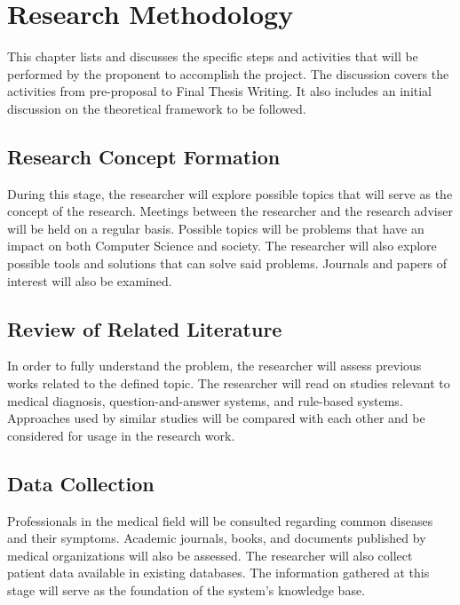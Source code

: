 %
%
%                 

\chapter{Research Methodology}
This chapter lists and discusses the specific steps and activities that will be performed by the proponent to accomplish the project. 
The discussion covers the activities from pre-proposal to Final Thesis Writing.  It also includes an initial discussion on the theoretical
framework to be followed.

\section{Research Concept Formation}
During this stage, the researcher will explore possible topics that will serve as the concept of the research. 
Meetings between the researcher and the research adviser will be held on a regular basis. 
Possible topics will be problems that have an impact on both Computer Science and society.
The researcher will also explore possible tools and solutions that can solve said problems.
Journals and papers of interest will also be examined.

\section{Review of Related Literature}
In order to fully understand the problem, the researcher will assess previous works related to the defined topic.
The researcher will read on studies relevant to medical diagnosis, question-and-answer systems, and rule-based systems.
Approaches used by similar studies will be compared with each other and be considered for usage in the research work.

\section{Data Collection}
Professionals in the medical field will be consulted regarding common diseases and their symptoms.
Academic journals, books, and documents published by medical organizations will also be assessed.
The researcher will also collect patient data available in existing databases.
The information gathered at this stage will serve as the foundation of the system's knowledge base.

